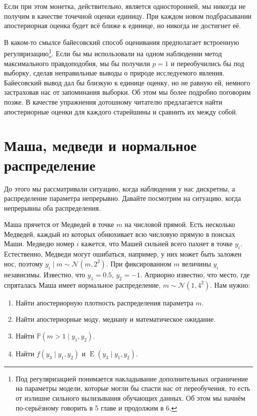 \documentclass[12pt, a4paper, oneside]{extreport}
\DeclareMathOperator{\E}{\mathop{E}}
\def \mN{\mathcal{N}}
\def \mbb{\mathbb}
\def \PP{\mbb{P}}
\theoremstyle{plain}              %
\theoremstyle{definition}         %
\begin{document}
Если при этом монетка, действительно, является односторонней, мы никогда не получим в качестве точечной оценки единицу. При каждом новом подбрасывании апостериорная оценка будет всё ближе к единице, но никогда не достигнет её.  

В каком-то смылсе байесовский способ оценивания предполагает встроенную регуляризацию\footnote{Под регуляризацией понимается накладывание дополнительных ограничение на параметры модели, которые могли бы спасти нас от переобучения, то есть от излишне сильного вылизывания обучающих данных. Об этом мы начнём по-серьёзному говорить в 5 главе и продолжим в 6.}. Если бы мы использовали на одном наблюдении метод максимального правдоподобия, мы бы получили $p=1$ и переобучились бы под выборку, сделав неправильные выводы о природе исследуемого явления. Байесовский вывод дал бы близкую к единице оценку, но не равную ей, немного застраховав нас от запоминания выборки.  Об этом мы более подробно поговорим позже.  В качестве упражнения дотошному читателю предлагается найти апостериорные оценки для каждого старейшины и сравнить их между собой.

\section{Маша, медведи и нормальное распределение}

До этого мы рассматривали ситуацию, когда наблюдения у нас дискретны, а распределение параметра непрерывно. Давайте посмотрим на ситуацию, когда непрерывны оба распределения. 

Маша прячется от Медведей в точке $m$ на числовой прямой. Есть несколько Медведей, каждый из которых обнюхивает всю числовую прямую в поисках Маши. Медведю номер $i$ кажется, что Машей сильней всего пахнет в точке $y_i$. Естественно, Медведи могут ошибаться, например, у них может быть заложен нос, поэтому $y_i \mid m \sim \mN(m, 2^2)$. При фиксированном $m$ величины $y_i$ независимы. Известно, что $y_1 = 0.5$, $y_2 = −1$.  Априорно известно, что место, где спряталась Маша имеет нормальное распределение, $m \sim \mN(1, 4^2)$. Нам нужно:

\begin{enumerate}
\item Найти апостериорную плотность распределения параметра $m$.
\item Найти апостериорные моду, медиану и математическое ожидание.
\item Найти $\PP(m > 1 \mid y_1,y_2)$.
\item Найти $f(y_3 \mid y_1,y_2)$ и $\E(y_3 \mid y_1,y_2)$.
\end{enumerate}
\end{document}
